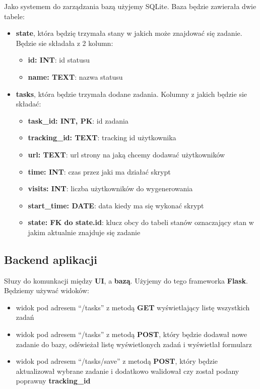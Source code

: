 \documentclass{article}
\begin{document}
Jako systemem do zarządzania bazą użyjemy SQLite. Baza będzie zawierała dwie tabele:
\begin{itemize}
\item \textbf{state}, która będzię trzymała stany w jakich może znajdować się zadanie. Będzie sie składała z 2 kolumn:
\begin{itemize}
\item \textbf{id: INT}: id statusu
\item \textbf{name: TEXT}: nazwa statusu
\end{itemize}
\item \textbf{tasks}, która będzie trzymała dodane zadania. Kolumny z jakich będzie sie składać:
\begin{itemize}
\item \textbf{task\_id: INT, PK}: id zadania
\item \textbf{tracking\_id: TEXT}: tracking id użytkownika
\item \textbf{url: TEXT}: url strony na jaką chcemy dodawać użytkowników
\item \textbf{time: INT}: czas przez jaki ma działać skrypt
\item \textbf{visits: INT}: liczba użytkowników do wygenerowania
\item \textbf{start\_time: DATE}: data kiedy ma się wykonać skrypt
\item \textbf{state: FK do state.id}: klucz obcy do tabeli stanów oznaczający stan w jakim aktualnie znajduje się zadanie
\end{itemize}
\end{itemize} 

\subsection{Backend aplikacji}
Słuzy do komunkacji między \textbf{UI}, a \textbf{bazą}. Użyjemy do tego frameworka \textbf{Flask}. Będziemy używać widoków:
\begin{itemize}
\item widok pod adresem ``/tasks'' z metodą \textbf{GET} wyświetlający listę wszystkich zadań
\item widok pod adresem ``/tasks'' z metodą \textbf{POST}, który będzie dodawał nowe zadanie do bazy, odświeżał listę wyświetlonych zadań i wyświetlał formularz
\item widok pod adresem ``/tasks/save'' z metodą \textbf{POST}, który będzie aktualizował wybrane zadanie i dodatkowo walidował czy został podany poprawny \textbf{tracking\_id}
\end{itemize}
\end{document}
